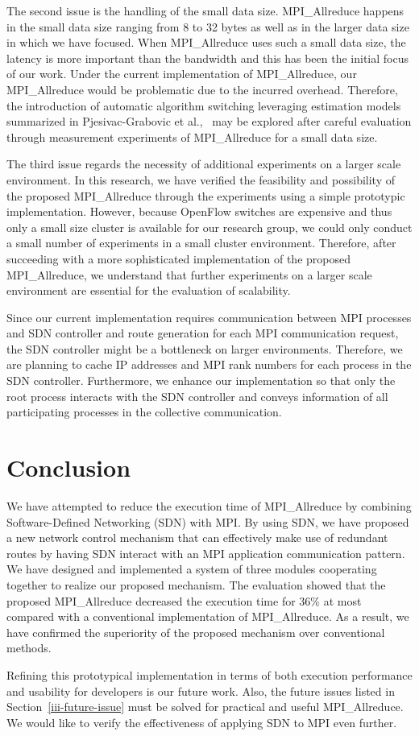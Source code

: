 The second issue is the handling of the small data size.
MPI\_Allreduce happens in the small data size ranging from 8 to
32 bytes as well as in the larger data size in which we have focused.
When MPI\_Allreduce uses such a small data size, the latency is
more important than the bandwidth and this has been the initial focus of
our work. Under the current implementation of MPI\_Allreduce,
our MPI\_Allreduce would be problematic due to the incurred
overhead. Therefore, the introduction of automatic algorithm switching
leveraging estimation models summarized in Pjesivac-Grabovic et
al.,~\autocite{PjesivacGrbovic} may be explored after careful evaluation through
measurement experiments of MPI\_Allreduce for a small data size.

The third issue regards the necessity of additional experiments on a
larger scale environment. In this research, we have verified the
feasibility and possibility of the proposed MPI\_Allreduce
through the experiments using a simple prototypic implementation.
However, because OpenFlow switches are expensive and thus only a small
size cluster is available for our research group, we could only conduct
a small number of experiments in a small cluster environment. Therefore,
after succeeding with a more sophisticated implementation of the
proposed MPI\_Allreduce, we understand that further experiments
on a larger scale environment are essential for the evaluation of
scalability.

Since our current implementation requires communication between MPI
processes and SDN controller and route generation for each MPI
communication request, the SDN controller might be a bottleneck on
larger environments. Therefore, we are planning to cache IP addresses
and MPI rank numbers for each process in the SDN controller.
Furthermore, we enhance our implementation so that only the root process
interacts with the SDN controller and conveys information of all
participating processes in the collective communication.

\section{Conclusion}\label{iii-conclusion}

We have attempted to reduce the execution time of
MPI\_Allreduce by combining Software-Defined Networking (SDN)
with MPI\@. By using SDN, we have proposed a new network control mechanism
that can effectively make use of redundant routes by having SDN interact
with an MPI application communication pattern. We have designed and
implemented a system of three modules cooperating together to realize
our proposed mechanism. The evaluation showed that the proposed
MPI\_Allreduce decreased the execution time for 36\% at most
compared with a conventional implementation of MPI\_Allreduce.
As a result, we have confirmed the superiority of the proposed mechanism
over conventional methods.

Refining this prototypical implementation in terms of both execution
performance and usability for developers is our future work. Also, the
future issues listed in Section~\ref{iii-future-issue} must be solved for
practical and useful MPI\_Allreduce. We would like to verify
the effectiveness of applying SDN to MPI even further.
